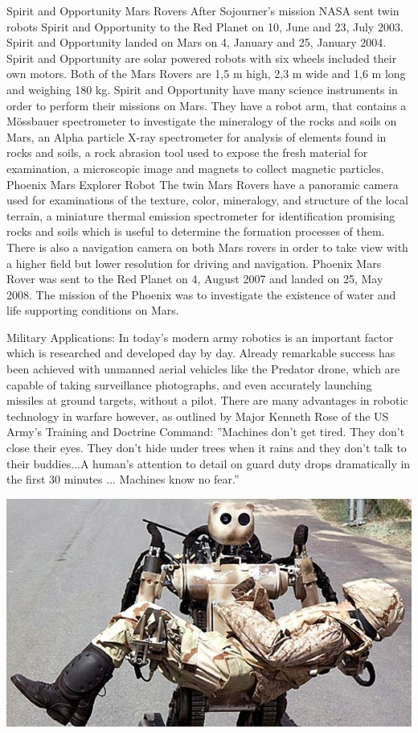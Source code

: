 \documentclass{fisatproject}
\begin{document}
Spirit and Opportunity Mars Rovers After Sojourner's mission NASA sent twin robots Spirit and Opportunity to the Red Planet on 10, June and 23, July 2003. Spirit and Opportunity landed on Mars on 4, January and 25, January 2004. 
Spirit and Opportunity are solar powered robots with six wheels included their own motors. Both of the Mars Rovers are 1,5 m high, 2,3 m wide and 1,6 m long and weighing 180 kg. Spirit and Opportunity have many science instruments in order to perform their missions on Mars. They have a robot arm, that contains a Mössbauer spectrometer to investigate the mineralogy of the rocks and soils on Mars, an Alpha particle X-ray spectrometer for analysis of elements found in rocks and soils, a rock abrasion tool used to expose the fresh material for examination, a microscopic image and magnets to collect magnetic particles.
Phoenix Mars Explorer Robot The twin Mars Rovers have a panoramic camera used for examinations of the texture, color, mineralogy, and structure of the local terrain, a miniature thermal emission spectrometer for identification promising rocks and soils which is useful to determine the formation processes of them. There is also a navigation camera on both Mars rovers in order to take view with a higher field but lower resolution for driving and navigation.\cite{j,k}
Phoenix Mars Rover was sent to the Red Planet on 4, August 2007 and landed on 25, May 2008. The mission of the Phoenix was to investigate the existence of water and life supporting conditions on Mars.

\vspace{1cm}
Military Applications: In today's modern army robotics is an important factor which is researched and developed day by day. Already remarkable success has been achieved with unmanned aerial vehicles like the Predator drone, which are capable of taking surveillance photographs, and even accurately launching missiles at ground targets, without a pilot. There are many advantages in robotic technology in warfare however, as outlined by Major Kenneth Rose of the US Army's Training and Doctrine Command: ''Machines don't get tired. They don't close their eyes. They don't hide under trees when it rains and they don't talk to their buddies...A human's attention to detail on guard duty drops dramatically in the first 30 minutes ... Machines know no fear.''

\begin{center}
\includegraphics[scale=.5]{mil.png}
\end{center}
\end{document}
